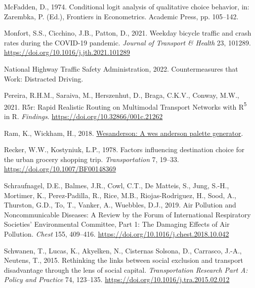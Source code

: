 \documentclass[
  letterpaper,
  DIV=11,
  numbers=noendperiod]{scrreport}
\newlength{\cslhangindent}
\newlength{\cslentryspacingunit} %
\newenvironment{CSLReferences}[2] %
 {%
  \setlength{\parindent}{0pt}
  \ifodd #1
  \let\oldpar\par
  \def\par{\hangindent=\cslhangindent\oldpar}
  \fi
  \setlength{\parskip}{#2\cslentryspacingunit}
 }%
 {}
\begin{document}
\begin{CSLReferences}{1}{0}
\leavevmode{}%
McFadden, D., 1974. Conditional logit analysis of qualitative choice
behavior, in: Zarembka, P. (Ed.), Frontiers in {Econometrics}. {Academic
Press}, pp. 105--142.

\leavevmode{}%
Monfort, S.S., Cicchino, J.B., Patton, D., 2021. Weekday bicycle traffic
and crash rates during the {COVID-19} pandemic. \emph{Journal of
Transport \& Health} 23, 101289.
\url{https://doi.org/10.1016/j.jth.2021.101289}

\leavevmode{}%
National Highway Traffic Safety Administration, 2022. Countermeasures
that {Work}: {Distracted Driving}.

\leavevmode{}%
Pereira, R.H.M., Saraiva, M., Herszenhut, D., Braga, C.K.V., Conway,
M.W., 2021. R5r: {Rapid Realistic Routing} on {Multimodal Transport
Networks} with {R}{\textsuperscript{5}} in {R}. \emph{Findings}.
\url{https://doi.org/10.32866/001c.21262}

\leavevmode{}%
Ram, K., Wickham, H., 2018.
\href{https://CRAN.R-project.org/package=wesanderson}{Wesanderson: A wes
anderson palette generator}.

\leavevmode{}%
Recker, W.W., Kostyniuk, L.P., 1978. Factors influencing destination
choice for the urban grocery shopping trip. \emph{Transportation} 7,
19--33. \url{https://doi.org/10.1007/BF00148369}

\leavevmode{}%
Schraufnagel, D.E., Balmes, J.R., Cowl, C.T., De Matteis, S., Jung,
S.-H., Mortimer, K., Perez-Padilla, R., Rice, M.B., Riojas-Rodriguez,
H., Sood, A., Thurston, G.D., To, T., Vanker, A., Wuebbles, D.J., 2019.
Air {Pollution} and {Noncommunicable Diseases}: {A Review} by the
{Forum} of {International Respiratory Societies}' {Environmental
Committee}, {Part} 1: {The Damaging Effects} of {Air Pollution}.
\emph{Chest} 155, 409--416.
\url{https://doi.org/10.1016/j.chest.2018.10.042}

\leavevmode{}%
Schwanen, T., Lucas, K., Akyelken, N., Cisternas Solsona, D., Carrasco,
J.-A., Neutens, T., 2015. Rethinking the links between social exclusion
and transport disadvantage through the lens of social capital.
\emph{Transportation Research Part A: Policy and Practice} 74, 123--135.
\url{https://doi.org/10.1016/j.tra.2015.02.012}


\end{CSLReferences}
\end{document}
